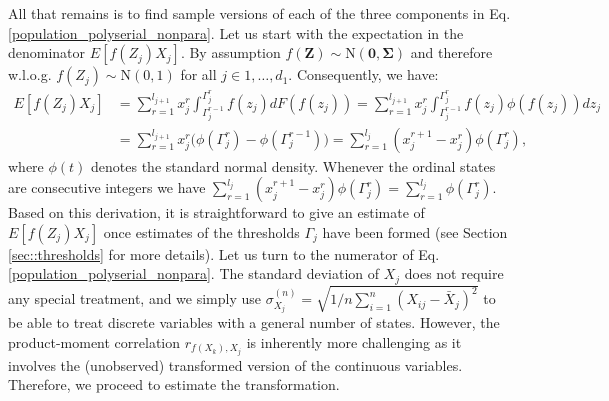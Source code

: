 All that remains is to find sample versions of each of the three components in Eq. \eqref{population_polyserial_nonpara}. Let us start with the expectation in the denominator $E[f(Z_j)X_j]$. By assumption $f(\mathbf{Z}) \sim \text{N}(\mathbf{0},\mathbf{\Sigma})$ and therefore w.l.o.g. $f(Z_j) \sim \text{N}(0,1)$ for all $j \in 1, \dots, d_1$. Consequently, we have:
\begin{equation}
    \begin{split}
        E[f(Z_j)X_j] &= \sum_{r=1}^{l_{j+1}} x^r_j \int_{\Gamma_j^{r-1}}^{\Gamma_j^{r}} f(z_j) d F(f(z_j)) = \sum_{r=1}^{l_{j+1}} x^r_j \int_{\Gamma_j^{r-1}}^{\Gamma_j^{r}} f(z_j) \phi(f(z_j)) dz_j \\
        &= \sum_{r=1}^{l_{j+1}} x^r_j \bigg(\phi(\Gamma_j^r) - \phi(\Gamma_j^{r-1}) \bigg) = \sum_{r=1}^{l_{j}} (x^{r+1}_j - x^r_j)\phi(\Gamma_j^r),
    \end{split}
\end{equation}
where $\phi(t)$ denotes the standard normal density. Whenever the ordinal states are consecutive integers we have $\sum_{r=1}^{l_{j}} (x^{r+1}_j - x^r_j)\phi(\Gamma_j^r) = \sum_{r=1}^{l_{j}}\phi(\Gamma_j^r)$. Based on this derivation, it is straightforward to give an estimate of $E[f(Z_j)X_j]$ once estimates of the thresholds $\Gamma_j$ have been formed (see Section \ref{sec::thresholds} for more details). Let us turn to the numerator of Eq. \eqref{population_polyserial_nonpara}. The standard deviation of $X_j$ does not require any special treatment, and we simply use $\sigma^{(n)}_{X_j} = \sqrt{1/n \sum_{i=1}^n (X_{ij} - \bar{X}_{j})^2}$ to be able to treat discrete variables with a general number of states. However, the product-moment correlation $r_{f(X_k), X_j}$ is inherently more challenging as it involves the (unobserved) transformed version of the continuous variables. Therefore, we proceed to estimate the transformation.

